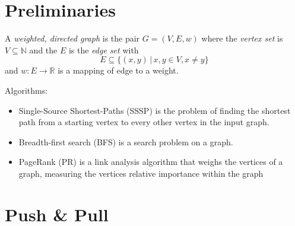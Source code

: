 \documentclass{meetings}
\begin{document}
\section{Preliminaries}
\begin{multicols}{2}
A \emph{weighted, directed graph} is the pair $G=(V,E,w)$ where the \emph{vertex set} is $V\subseteq\mathbb N$ and the $E$ is the \emph{edge set} with
	\begin{equation*}
	  E\subseteq\{(x,y)\,|\, x,y\in V, x\neq y\}
	\end{equation*}
	and $w:E\rightarrow \mathbb R$ is a mapping of edge to a weight.
	


	\columnbreak

	
	Algorithms:
\begin{itemize}
	\item Single-Source Shortest-Paths (SSSP) is the problem of finding the shortest path from a starting vertex to every other vertex in the input graph.

	\item Breadth-first search (BFS) is a search problem on a graph.


	\item PageRank (PR) is a link analysis algorithm that weighs the vertices of a graph, measuring the vertices relative importance within the graph

\end{itemize}
\end{multicols}


\clearpage
\section{Push \& Pull}
\end{document}
